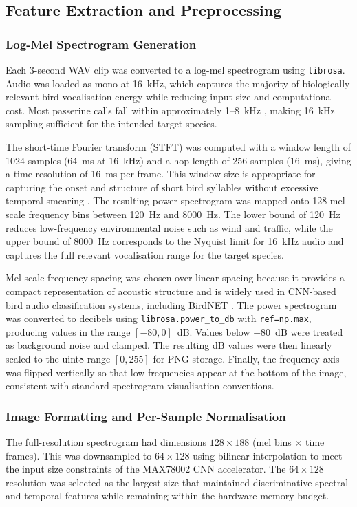 \documentclass[conference]{IEEEtran}
\begin{document}
\subsection{Feature Extraction and Preprocessing}

\subsubsection{Log-Mel Spectrogram Generation}
Each 3-second WAV clip was converted to a log-mel spectrogram using \texttt{librosa}. Audio was loaded as mono at 16~kHz, which captures the majority of biologically relevant bird vocalisation energy while reducing input size and computational cost. Most passerine calls fall within approximately 1--8~kHz \cite{kahl2021birdnet}, making 16~kHz sampling sufficient for the intended target species.

The short-time Fourier transform (STFT) was computed with a window length of 1024 samples (64~ms at 16~kHz) and a hop length of 256 samples (16~ms), giving a time resolution of 16~ms per frame. This window size is appropriate for capturing the onset and structure of short bird syllables without excessive temporal smearing \cite{sprengel2016audio}. The resulting power spectrogram was mapped onto 128 mel-scale frequency bins between 120~Hz and 8000~Hz. The lower bound of 120~Hz reduces low-frequency environmental noise such as wind and traffic, while the upper bound of 8000~Hz corresponds to the Nyquist limit for 16~kHz audio and captures the full relevant vocalisation range for the target species.

Mel-scale frequency spacing was chosen over linear spacing because it provides a compact representation of acoustic structure and is widely used in CNN-based bird audio classification systems, including BirdNET \cite{kahl2021birdnet}. The power spectrogram was converted to decibels using \texttt{librosa.power\_to\_db} with \texttt{ref=np.max}, producing values in the range $[-80, 0]$~dB. Values below $-80$~dB were treated as background noise and clamped. The resulting dB values were then linearly scaled to the uint8 range $[0,255]$ for PNG storage. Finally, the frequency axis was flipped vertically so that low frequencies appear at the bottom of the image, consistent with standard spectrogram visualisation conventions.

\subsubsection{Image Formatting and Per-Sample Normalisation}
The full-resolution spectrogram had dimensions $128 \times 188$ (mel bins $\times$ time frames). This was downsampled to $64 \times 128$ using bilinear interpolation to meet the input size constraints of the MAX78002 CNN accelerator. The $64 \times 128$ resolution was selected as the largest size that maintained discriminative spectral and temporal features while remaining within the hardware memory budget.
\end{document}
